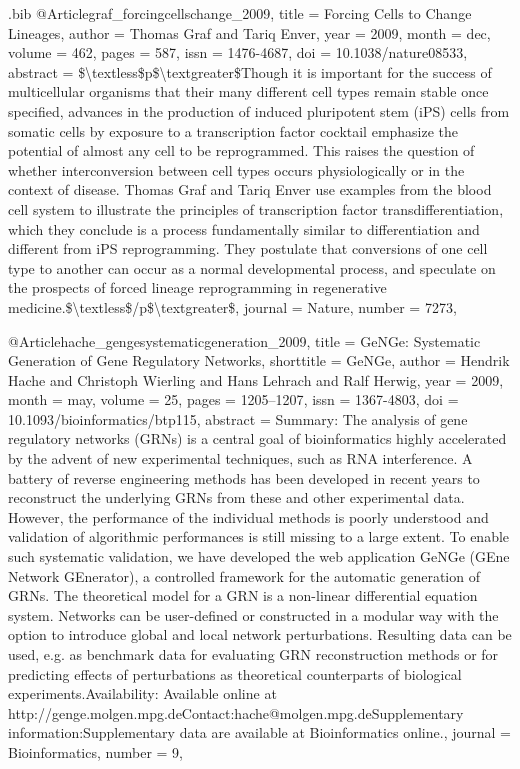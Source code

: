 \documentclass[
  table,
  10pt,
  a4paper]{article}
\begin{document}
\begin{filecontents}{\jobname.bib}
@Article{graf_forcingcellschange_2009,
	title = {Forcing {{Cells}} to {{Change Lineages}}},
	author = {Thomas Graf and Tariq Enver},
	year = {2009},
	month = {dec},
	volume = {462},
	pages = {587},
	issn = {1476-4687},
	doi = {10.1038/nature08533},
	abstract = {\$\textbackslash textless\$p\$\textbackslash textgreater\$Though it is important for the success of multicellular organisms that their many different cell types remain stable once specified, advances in the production of induced pluripotent stem (iPS) cells from somatic cells by exposure to a transcription factor cocktail emphasize the potential of almost any cell to be reprogrammed. This raises the question of whether interconversion between cell types occurs physiologically or in the context of disease. Thomas Graf and Tariq Enver use examples from the blood cell system to illustrate the principles of transcription factor transdifferentiation, which they conclude is a process fundamentally similar to differentiation and different from iPS reprogramming. They postulate that conversions of one cell type to another can occur as a normal developmental process, and speculate on the prospects of forced lineage reprogramming in regenerative medicine.\$\textbackslash textless\$/p\$\textbackslash textgreater\$},
	journal = {Nature},
	number = {7273},
}

@Article{hache_gengesystematicgeneration_2009,
	title = {{{GeNGe}}: Systematic Generation of Gene Regulatory Networks},
	shorttitle = {{{GeNGe}}},
	author = {Hendrik Hache and Christoph Wierling and Hans Lehrach and Ralf Herwig},
	year = {2009},
	month = {may},
	volume = {25},
	pages = {1205--1207},
	issn = {1367-4803},
	doi = {10.1093/bioinformatics/btp115},
	abstract = {Summary: The analysis of gene regulatory networks (GRNs) is a central goal of bioinformatics highly accelerated by the advent of new experimental techniques, such as RNA interference. A battery of reverse engineering methods has been developed in recent years to reconstruct the underlying GRNs from these and other experimental data. However, the performance of the individual methods is poorly understood and validation of algorithmic performances is still missing to a large extent. To enable such systematic validation, we have developed the web application GeNGe (GEne Network GEnerator), a controlled framework for the automatic generation of GRNs. The theoretical model for a GRN is a non-linear differential equation system. Networks can be user-defined or constructed in a modular way with the option to introduce global and local network perturbations. Resulting data can be used, e.g. as benchmark data for evaluating GRN reconstruction methods or for predicting effects of perturbations as theoretical counterparts of biological experiments.Availability: Available online at http://genge.molgen.mpg.deContact:hache@molgen.mpg.deSupplementary information:Supplementary data are available at Bioinformatics online.},
	journal = {Bioinformatics},
	number = {9},
}


\end{filecontents}
\end{document}
